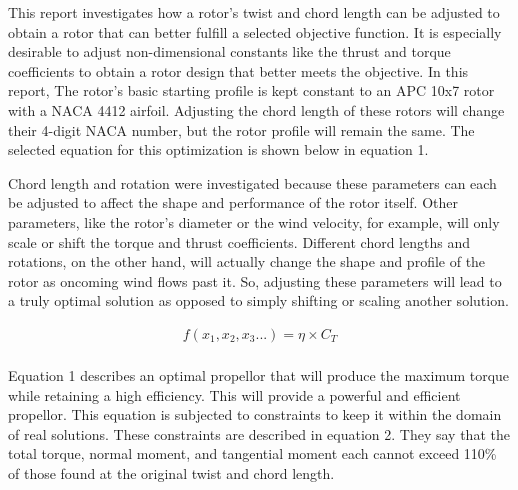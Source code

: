 \documentclass{article}
\begin{document}
This report investigates how a rotor's twist and chord length can be adjusted to obtain a rotor that can better fulfill a selected objective function. It is especially desirable to adjust non-dimensional constants like the thrust and torque coefficients to obtain a rotor design that better meets the objective. In this report, The rotor's basic starting profile is kept constant to an APC 10x7 rotor with a NACA 4412 airfoil. Adjusting the chord length of these rotors will change their 4-digit NACA number, but the rotor profile will remain the same. The selected equation for this optimization is shown below in equation 1. \newline

Chord length and rotation were investigated because these parameters can each be adjusted to affect the shape and performance of the rotor itself. Other parameters, like the rotor's diameter or the wind velocity, for example, will only scale or shift the torque and thrust coefficients. Different chord lengths and rotations, on the other hand, will actually change the shape and profile of the rotor as oncoming wind flows past it. So, adjusting these parameters will lead to a truly optimal solution as opposed to simply shifting or scaling another solution. \newline

\begin{equation}
\begin{aligned}
	f(x_{1}, x_{2}, x_{3}...) = \eta \times C_{T} \\
\end{aligned}
\end{equation} 

Equation 1 describes an optimal propellor that will produce the maximum torque while retaining a high efficiency. This will provide a powerful and efficient propellor. This equation is subjected to constraints to keep it within the domain of real solutions. These constraints are described in equation 2. They say that the total torque, normal moment, and tangential moment each cannot exceed 110\% of those found at the original twist and chord length. \newline
\end{document}
